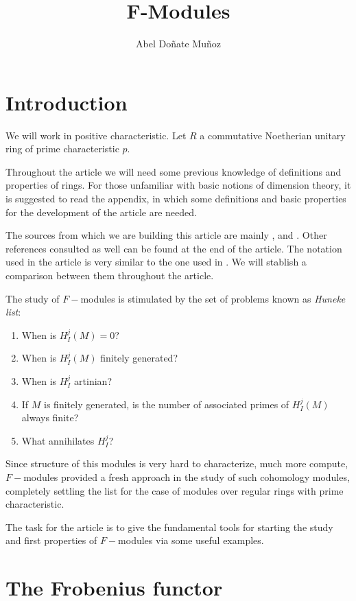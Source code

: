 \documentclass[leqno]{article}
\title{F-Modules}
\author{Abel Doñate Muñoz}
\date{}
\theoremstyle{definition}
\begin{document}
\maketitle
\tableofcontents
\newpage

\section{Introduction}
We will work in positive characteristic. Let $R$ a commutative Noetherian unitary ring of prime characteristic $p$.

Throughout the article we will need some previous knowledge of definitions and properties of rings. For those unfamiliar with basic notions of dimension theory, it is suggested to read the appendix, in which some definitions and basic properties for the development of the article are needed.

The sources from which we are building this article are mainly \cite{quingles}, \cite{blickle} and \cite{lyu97}. Other references consulted as well can be found at the end of the article. The notation used in the article is very similar to the one used in \cite{quingles}. We will stablish a comparison between them throughout the article.

The study of $F-$modules is stimulated by the set of problems known as \textit{Huneke list}:
\begin{enumerate}[topsep=-6pt, itemsep=0pt]
  \item When is $H_I^j(M)=0$?
  \item When is  $H_I^j(M)$ finitely generated? 
  \item When is $H_{I}^j$ artinian?
  \item If  $M$ is finitely generated, is the number of associated primes of  $H_I^j(M)$ always finite?
  \item What annihilates  $H_I^j$?
\end{enumerate}

Since structure of this modules is very hard to characterize, much more compute, $F-$modules provided a fresh approach in the study of such cohomology modules, completely settling the list for the case of modules over regular rings with prime characteristic.

The task for the article is to give the fundamental tools for starting the study and first properties of  $F-$modules via some useful examples.

\section{The Frobenius functor}
\end{document}
